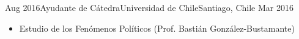 \begin{experiences}
  \emptySeparator 
  \experience 
    {Aug 2016}{Ayudante de Cátedra}{Universidad de Chile}{Santiago, Chile} {Mar 2016}
    {\begin{itemize}
    \item Estudio de los Fenómenos Políticos {\small (Prof. Bastián González-Bustamante)}
    \end{itemize}}
    {}
\end{experiences}
